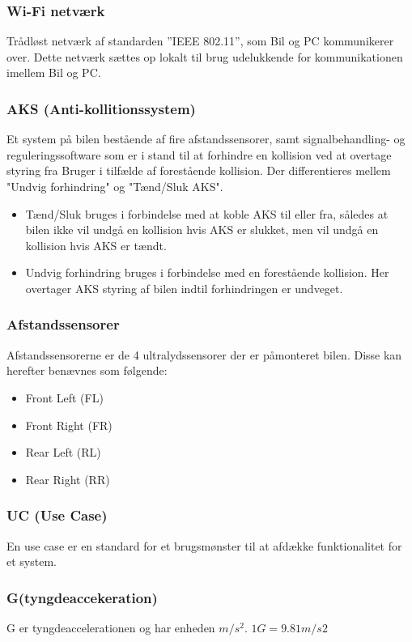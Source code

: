 \subsubsection{Wi-Fi netværk}
Trådløst netværk af standarden ''IEEE 802.11'', som Bil og PC kommunikerer over. Dette netværk sættes op lokalt til brug udelukkende for kommunikationen imellem Bil og PC. 

\subsubsection{AKS (Anti-kollitionssystem)}
Et system på bilen bestående af fire afstandssensorer, samt signalbehandling- og reguleringssoftware som er i stand til at forhindre en kollision ved at overtage styring fra Bruger i tilfælde af forestående kollision. Der differentieres mellem "Undvig forhindring" og "Tænd/Sluk AKS".

\begin{itemize}
	\item Tænd/Sluk bruges i forbindelse med at koble AKS til eller fra, således at bilen ikke vil undgå en kollision hvis AKS er slukket, men vil undgå en kollision hvis AKS er tændt. 
	\item Undvig forhindring bruges i forbindelse med en forestående kollision. Her overtager AKS styring af bilen indtil forhindringen er undveget. 
\end{itemize}

\subsubsection{Afstandssensorer}
Afstandssensorerne er de 4 ultralydssensorer der er påmonteret bilen. Disse kan herefter benævnes som følgende:
\begin{itemize}
	\item Front Left (FL)
	\item Front Right (FR)
	\item Rear Left (RL)
	\item Rear Right (RR)	
\end{itemize}

\subsubsection{UC (Use Case)}
En use case er en standard for et brugsmønster til at afdække funktionalitet for et system.

\subsubsection{G(tyngdeaccekeration)}
G er tyngdeaccelerationen og har enheden $m/s^2$. $1G=9.81 m/s2$

\clearpage